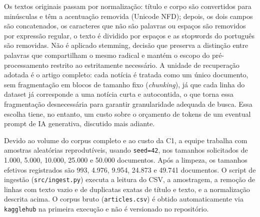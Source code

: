 \documentclass[12pt, a4paper]{article}
\begin{document}
Os textos originais passam por normalização: título e corpo são convertidos para minúsculas e têm a acentuação removida (Unicode NFD); depois, os dois campos são concatenados, os caracteres que não são palavras ou espaços são removidos por expressão regular, o texto é dividido por espaços e as stopwords do português são removidas. Não é aplicado stemming, decisão que preserva a distinção entre palavras que compartilham o mesmo radical e mantém o escopo do pré-processamento restrito ao estritamente necessário. A unidade de recuperação adotada é o artigo completo: cada notícia é tratada como um único documento, sem fragmentação em blocos de tamanho fixo (\textit{chunking}), já que cada linha do dataset já corresponde a uma notícia curta e autocontida, o que torna essa fragmentação desnecessária para garantir granularidade adequada de busca. Essa escolha tiene, no entanto, um custo sobre o orçamento de tokens de um eventual prompt de IA generativa, discutido mais adiante.

\begin{center}
\end{center}

Devido ao volume do corpus completo e ao custo da C1, a equipe trabalha com amostras aleatórias reprodutíveis, usando \texttt{seed=42}, nos tamanhos solicitados de 1.000, 5.000, 10.000, 25.000 e 50.000 documentos. Após a limpeza, os tamanhos efetivos registrados são 993, 4.976, 9.954, 24.873 e 49.741 documentos. O script de ingestão (\texttt{src/ingest.py}) executa a leitura do CSV, a amostragem, a remoção de linhas com texto vazio e de duplicatas exatas de título e texto, e a normalização descrita acima. O corpus bruto (\texttt{articles.csv}) é obtido automaticamente via \texttt{kagglehub} na primeira execução e não é versionado no repositório.
\end{document}
